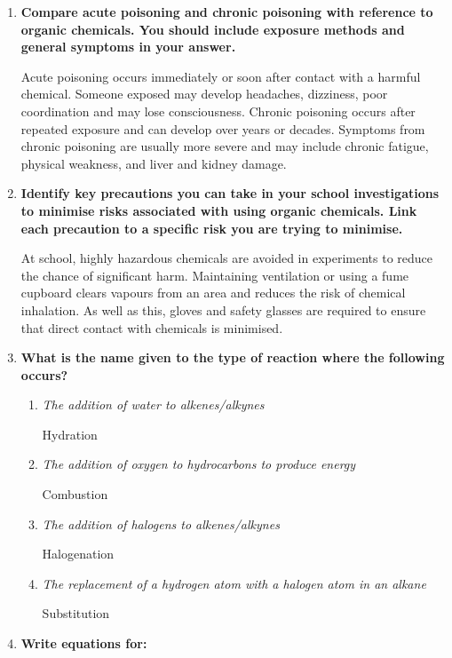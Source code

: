 \documentclass{report}
\begin{document}
\begin{enumerate}
		\item \textbf{Compare acute poisoning and chronic poisoning with reference to organic chemicals. You should include exposure methods and general symptoms in your answer.}

			Acute poisoning occurs immediately or soon after contact with a harmful chemical. Someone exposed may develop headaches, dizziness, poor coordination and may lose consciousness. Chronic poisoning occurs after repeated exposure and can develop over years or decades. Symptoms from chronic poisoning are usually more severe and may include chronic fatigue, physical weakness, and liver and kidney damage.
			
		\item \textbf{Identify key precautions you can take in your school investigations to minimise risks associated with using organic chemicals. Link each precaution to a specific risk you are trying to minimise.}

			At school, highly hazardous chemicals are avoided in experiments to reduce the chance of significant harm. Maintaining ventilation or using a fume cupboard clears vapours from an area and reduces the risk of chemical inhalation. As well as this, gloves and safety glasses are required to ensure that direct contact with chemicals is minimised.

		\item \textbf{What is the name given to the type of reaction where the following occurs?}

			\begin{enumerate}
				\item \textit{The addition of water to alkenes/alkynes}

					Hydration

				\item \textit{The addition of oxygen to hydrocarbons to produce energy}

					Combustion

				\item \textit{The addition of halogens to alkenes/alkynes}

					Halogenation

				\item \textit{The replacement of a hydrogen atom with a halogen atom in an alkane}

					Substitution
			\end{enumerate}

		\item \textbf{Write equations for:}


\end{enumerate}
\end{document}

